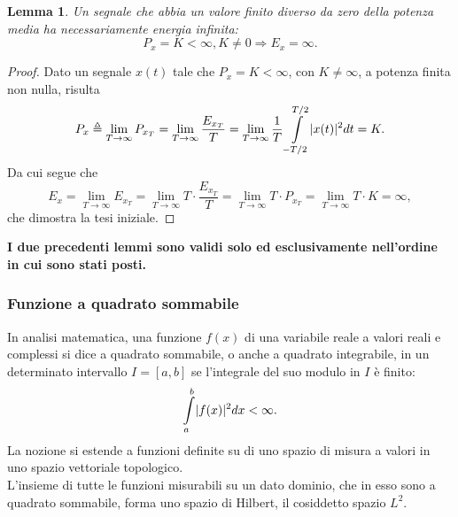 \documentclass[12pt,oneside,openany]{memoir}
\numberwithin{equation}{subsection}
\newtheorem{lemma}[theorem]{Lemma}
\DeclarePairedDelimiter{\abs}{\lvert}{\rvert}
\begin{document}
\begin{lemma}
Un segnale che abbia un valore finito diverso da zero della potenza media ha
	necessariamente energia infinita:
\begin{equation}
	P_x = K < \infty, K \neq 0 \Longrightarrow E_x = \infty.
\end{equation}
\end{lemma}
\begin{proof}
Dato un segnale $x(t)$ tale che $P_x = K < \infty$, con $K \neq \infty$, a
	potenza finita non nulla, risulta
\begin{equation}
	P_x \triangleq \lim_{T \rightarrow \infty} P_{x_T} =
	\lim_{T \rightarrow \infty} \frac{E_{x_T}}{T} = 
	\lim_{T \rightarrow \infty} \frac{1}{T} 
	\int\displaylimits_{-T/2}^{T/2} \abs{x(t)}^2 dt = K.
\end{equation}
Da cui segue che
\begin{equation}
	E_x = \lim_{T \rightarrow \infty} E_{x_T} = \lim_{T \rightarrow \infty}
	T \cdot \frac{E_{x_T}}{T} = \lim_{T \rightarrow \infty} T \cdot P_{x_T}
	= \lim_{T \rightarrow \infty} T \cdot K = \infty,
\end{equation}
che dimostra la tesi iniziale.
\end{proof}

\noindent\textbf{I due precedenti lemmi sono validi solo ed esclusivamente
nell'ordine in cui sono stati posti.}


\subsubsection{Funzione a quadrato sommabile}
In analisi matematica, una funzione $f(x)$ di una variabile reale a valori reali
e complessi si dice a quadrato sommabile, o anche a quadrato integrabile, in un
determinato intervallo $I = \left[a, b\right]$ se l'integrale del suo modulo in
$I$ \`e finito:
\begin{equation}
	\int\displaylimits_{a}^{b} \abs{f(x)}^2 dx < \infty.
\end{equation}
La nozione si estende a funzioni definite su di uno spazio di misura a valori in
uno spazio vettoriale topologico.\\
L'insieme di tutte le funzioni misurabili su un dato dominio, che in esso sono a
quadrato sommabile, forma uno spazio di Hilbert, il cosiddetto spazio $L^2$.
\end{document}
